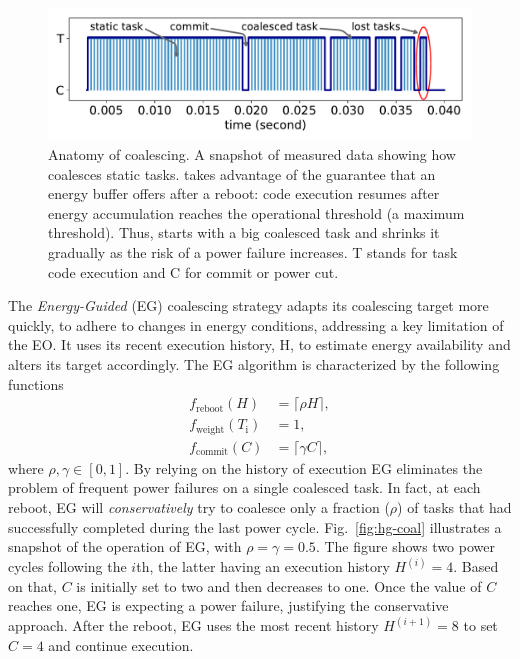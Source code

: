\begin{figure}
\centering
\includegraphics[width=.8\columnwidth]{figures/dif_cap}
    \caption{Anatomy of \sys coalescing. A snapshot of measured data showing how \sys coalesces static tasks. \sys takes advantage of the guarantee that an energy buffer offers after a reboot: code execution resumes after energy accumulation reaches the operational threshold (a maximum threshold). Thus, \sys starts with a big coalesced task and shrinks it gradually as the risk of a power failure increases. T stands for task code execution and C for commit or power cut.}
    \label{fig:coal_anatomy}
\end{figure}

The \emph{Energy-Guided} (EG) coalescing strategy adapts its coalescing target more quickly, to adhere to changes in energy conditions,  addressing a key limitation of the EO. It uses its recent execution history, H, to estimate energy availability and alters its target accordingly. The EG algorithm is characterized by the following functions
%
\begin{equation}
	\begin{split}
		 f_\text{reboot}(H) & = \lceil \rho H \rceil,\\
		 f_\text{weight}(T_\text{i}) & = 1, \\
		 f_\text{commit}(C) & = \lceil \gamma C \rceil,
	\end{split}
	\label{eq:eg}
\end{equation}
%
where $\rho, \gamma \in [0, 1]$. By relying on the history of execution EG eliminates the problem of frequent power failures on a single coalesced task. In fact, at each reboot, EG will {\em conservatively} try to coalesce only a fraction ($\rho$) of tasks that had successfully completed during the last power cycle.
Fig.~\ref{fig:hg-coal} illustrates a snapshot of the operation of EG, with $\rho = \gamma = 0.5$. The figure shows two power cycles following the $i$th, the latter having an execution history $H^{(i)} = 4$. Based on that, $C$ is initially set to two and then decreases to one. Once the value of $C$ reaches one, EG is expecting a power failure, justifying the conservative approach. After the reboot, EG uses the most recent history $H^{(i+1)} = 8$ to set $C = 4$ and continue execution.

